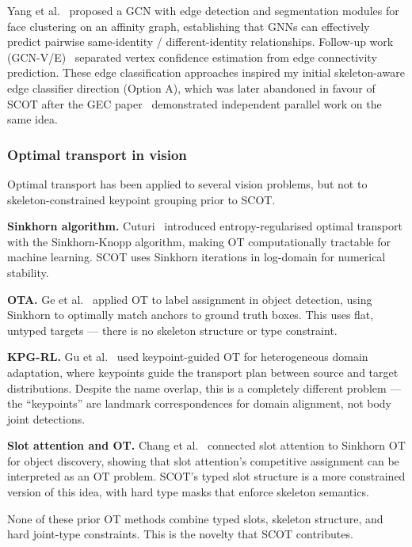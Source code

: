 Yang et al.~\cite{yang2019face} proposed a GCN with edge detection and segmentation modules for face clustering on an affinity graph, establishing that GNNs can effectively predict pairwise same-identity / different-identity relationships. Follow-up work (GCN-V/E)~\cite{yang2020gcnve} separated vertex confidence estimation from edge connectivity prediction. These edge classification approaches inspired my initial skeleton-aware edge classifier direction (Option A), which was later abandoned in favour of SCOT after the GEC paper~\cite{maher2025gec} demonstrated independent parallel work on the same idea.

\subsubsection{Optimal transport in vision}

Optimal transport has been applied to several vision problems, but not to skeleton-constrained keypoint grouping prior to SCOT.

\textbf{Sinkhorn algorithm.} Cuturi~\cite{cuturi2013sinkhorn} introduced entropy-regularised optimal transport with the Sinkhorn-Knopp algorithm, making OT computationally tractable for machine learning. SCOT uses Sinkhorn iterations in log-domain for numerical stability.

\textbf{OTA.} Ge et al.~\cite{ge2021ota} applied OT to label assignment in object detection, using Sinkhorn to optimally match anchors to ground truth boxes. This uses flat, untyped targets --- there is no skeleton structure or type constraint.

\textbf{KPG-RL.} Gu et al.~\cite{gu2022kpgrl} used keypoint-guided OT for heterogeneous domain adaptation, where keypoints guide the transport plan between source and target distributions. Despite the name overlap, this is a completely different problem --- the ``keypoints'' are landmark correspondences for domain alignment, not body joint detections.

\textbf{Slot attention and OT.} Chang et al.~\cite{chang2022slotot} connected slot attention to Sinkhorn OT for object discovery, showing that slot attention's competitive assignment can be interpreted as an OT problem. SCOT's typed slot structure is a more constrained version of this idea, with hard type masks that enforce skeleton semantics.

None of these prior OT methods combine typed slots, skeleton structure, and hard joint-type constraints. This is the novelty that SCOT contributes.

